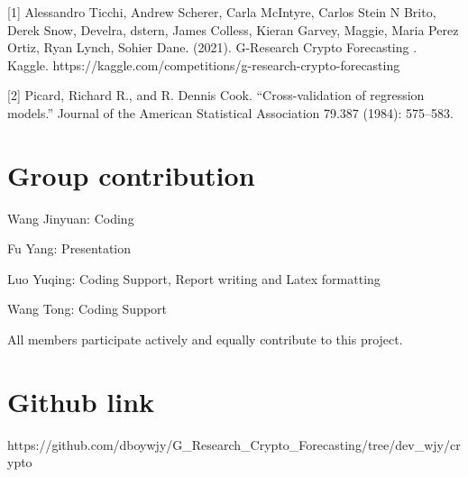\documentclass{article}
\begin{document}
[1] Alessandro Ticchi, Andrew Scherer, Carla McIntyre, Carlos Stein N Brito, Derek Snow, Develra, dstern, James Colless, Kieran Garvey, Maggie, Maria Perez Ortiz, Ryan Lynch, Sohier Dane. (2021). G-Research Crypto Forecasting . Kaggle. https://kaggle.com/competitions/g-research-crypto-forecasting


[2] Picard, Richard R., and R. Dennis Cook. “Cross-validation of regression models.” Journal of the American Statistical Association 79.387 (1984): 575–583.

\section*{Group contribution}
Wang Jinyuan: Coding

Fu Yang: Presentation 

Luo Yuqing: Coding Support, Report writing and Latex formatting

Wang Tong: Coding Support

All members participate actively and equally contribute to this project.

\section*{Github link}
https://github.com/dboywjy/G_Research_Crypto_Forecasting/tree/dev_wjy/crypto
\end{document}
